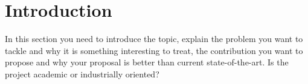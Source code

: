 \section{Introduction}\label{sec:introduction}

In this section you need to introduce the topic, explain the problem you want to tackle and why it is something interesting to treat, 
the contribution you want to propose and why your proposal is better than current state-of-the-art. Is the project academic or industrially oriented?